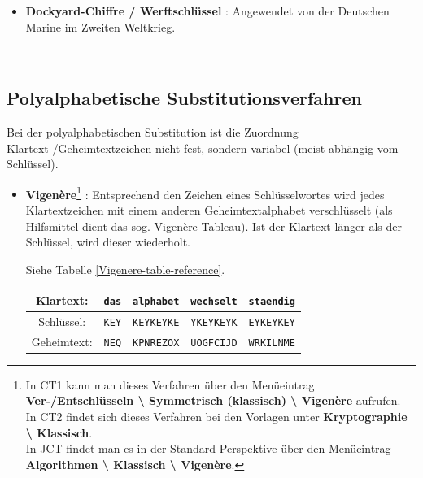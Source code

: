 \begin{refsegment}
\begin{itemize}
\item {\bf Dockyard-Chiffre / Werftschlüssel} \cite{Savard1999}:
   Angewendet von der Deutschen Marine im Zweiten Weltkrieg.

\end{itemize}
~\\


\subsection{Polyalphabetische Substitutionsverfahren}

Bei der polyalphabetischen Substitution
ist die Zuordnung Klartext-/Geheimtextzeichen nicht fest, sondern variabel
(meist abhängig vom Schlüssel).

\begin{itemize}

\item {\bf Vigen\`ere}\footnote{%
   In CT1 kann man dieses Verfahren über den Menüeintrag {\bf
   Ver-/Entschlüsseln \textbackslash{} Symmetrisch (klassisch)
   \textbackslash{} Vigen\`ere} aufrufen.\\
   In CT2 findet sich dieses Verfahren bei den Vorlagen
   unter {\bf Kryptographie \textbackslash{} Klassisch}.\\
   In JCT findet man es in der Standard-Perspektive
   über den Menüeintrag {\bf Algorithmen \textbackslash{} Klassisch
   \textbackslash{} Vigen\`ere}.
   }
   \cite{Singh2001}:
   Entsprechend den Zeichen eines Schlüsselwortes wird jedes Klartextzeichen
   mit einem anderen Geheimtextalphabet verschlüsselt (als Hilfsmittel dient
   das sog. Vigen\`ere-Tableau). Ist der Klartext länger als der Schlüssel,
   wird dieser wiederholt.

   Siehe Tabelle \ref{Vigenere-table-reference}.

   \begin{table}[ht]

   \begin{center}
   \begin{tabular}{|c|c|c|c|c|}
   \hline
   Klartext:   & {\tt das} & {\tt alphabet} & {\tt wechselt} & {\tt staendig}\\
   \hline
   Schlüssel: & {\tt KEY} & {\tt KEYKEYKE} & {\tt YKEYKEYK} & {\tt EYKEYKEY}\\
   \hline
   Geheimtext: & {\tt NEQ} & {\tt KPNREZOX} & {\tt UOGFCIJD} & {\tt WRKILNME}\\
   \hline
   \end{tabular}
   \end{center}


\end{table}
\end{itemize}
\end{refsegment}
